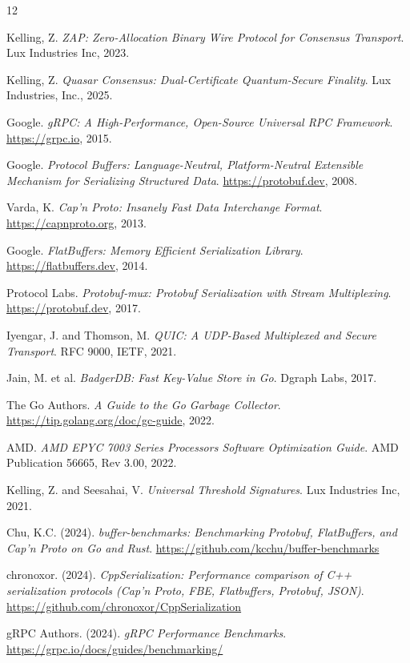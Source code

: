
\begin{thebibliography}{12}

Kelling, Z.
\textit{ZAP: Zero-Allocation Binary Wire Protocol for Consensus Transport}.
Lux Industries Inc, 2023.

Kelling, Z.
\textit{Quasar Consensus: Dual-Certificate Quantum-Secure Finality}.
Lux Industries, Inc., 2025.

Google.
\textit{gRPC: A High-Performance, Open-Source Universal RPC Framework}.
\url{https://grpc.io}, 2015.

Google.
\textit{Protocol Buffers: Language-Neutral, Platform-Neutral Extensible Mechanism for Serializing Structured Data}.
\url{https://protobuf.dev}, 2008.

Varda, K.
\textit{Cap'n Proto: Insanely Fast Data Interchange Format}.
\url{https://capnproto.org}, 2013.

Google.
\textit{FlatBuffers: Memory Efficient Serialization Library}.
\url{https://flatbuffers.dev}, 2014.

Protocol Labs.
\textit{Protobuf-mux: Protobuf Serialization with Stream Multiplexing}.
\url{https://protobuf.dev}, 2017.

Iyengar, J. and Thomson, M.
\textit{QUIC: A UDP-Based Multiplexed and Secure Transport}.
RFC 9000, IETF, 2021.

Jain, M. et al.
\textit{BadgerDB: Fast Key-Value Store in Go}.
Dgraph Labs, 2017.

The Go Authors.
\textit{A Guide to the Go Garbage Collector}.
\url{https://tip.golang.org/doc/gc-guide}, 2022.

AMD.
\textit{AMD EPYC 7003 Series Processors Software Optimization Guide}.
AMD Publication 56665, Rev 3.00, 2022.

Kelling, Z. and Seesahai, V.
\textit{Universal Threshold Signatures}.
Lux Industries Inc, 2021.


Chu, K.C. (2024).
\textit{buffer-benchmarks: Benchmarking Protobuf, FlatBuffers, and Cap'n Proto on Go and Rust}.
\url{https://github.com/kcchu/buffer-benchmarks}

chronoxor. (2024).
\textit{CppSerialization: Performance comparison of C++ serialization protocols (Cap'n Proto, FBE, Flatbuffers, Protobuf, JSON)}.
\url{https://github.com/chronoxor/CppSerialization}

gRPC Authors. (2024).
\textit{gRPC Performance Benchmarks}.
\url{https://grpc.io/docs/guides/benchmarking/}

\end{thebibliography}

